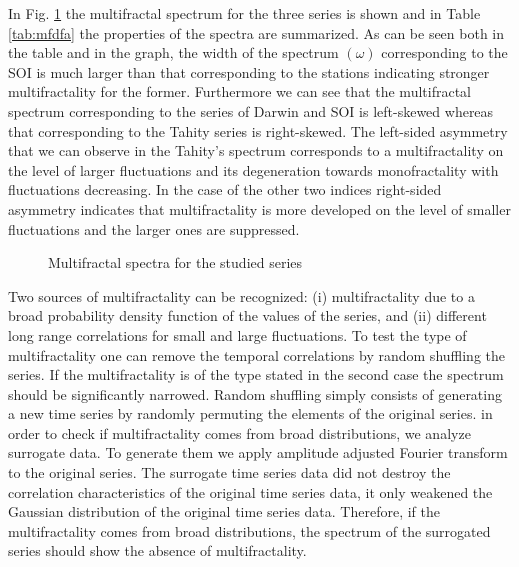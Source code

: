 \documentclass[onecolumn, preprint,aps,amsmath, amssymb, superscriptaddress]{revtex4}
\begin{document}
In Fig. \ref{fig:spectrum} the multifractal spectrum for the three series is shown and in Table \ref{tab:mfdfa} the properties of the spectra are summarized. As can be seen both in the table and in the graph, the width of the spectrum $(\omega)$ corresponding to the SOI is much larger than that corresponding to the stations indicating stronger multifractality for the former. Furthermore we can see that the multifractal spectrum corresponding to the series of Darwin and SOI is left-skewed whereas that corresponding to the Tahity series is right-skewed. The left-sided asymmetry that we can observe in the Tahity's spectrum corresponds to a  multifractality on the level of larger fluctuations and its degeneration towards monofractality with fluctuations decreasing. In the case of the other two indices right-sided asymmetry indicates that multifractality is more developed on the level of smaller fluctuations and the larger ones are suppressed.


\begin{figure}
\caption{Multifractal spectra for the studied series}
\label{fig:spectrum}
\end{figure}



Two sources of multifractality can be recognized: (i) multifractality due to a broad probability density function of the values of the series, and (ii) different long range correlations for small and large fluctuations. To test the type of multifractality one can remove the temporal correlations by random shuffling the series. If the multifractality is of the type stated in the second case the spectrum should be significantly narrowed. Random shuffling simply consists of generating a new time series by randomly permuting the elements of the original series. in order to check if multifractality comes from broad distributions, we analyze surrogate data. To generate them we apply amplitude adjusted Fourier transform to the original series. The surrogate time series data did not destroy the correlation characteristics of the original time series data, it only weakened the Gaussian distribution of the original time series data. Therefore, if the multifractality comes from broad distributions, the spectrum of the surrogated series should show the absence of multifractality. %
\end{document}
